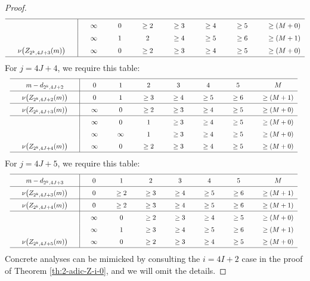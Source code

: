 \documentclass[12pt,reqno]{amsart}
\numberwithin{equation}{section}
\theoremstyle{theorem}
\theoremstyle{definition}
\begin{document}
\begin{proof}
\begin{align*}
{\begin{tabular*}{1.25\textwidth}{p{0pt}cp{0pt}|@{\extracolsep{\fill}}ccccccc}
				\hline
				&  && $\infty$ & $0$ & $\ge 2$ & $\ge 3$ & $\ge 4$ & $\ge 5$ & $\ge (M+0)$\\
				&  && $\infty$ & $1$ & $2$ & $\ge 4$ & $\ge 5$ & $\ge 6$ & $\ge (M+1)$\\
				& $\nu\big(Z_{2^k,4J+3}(m)\big)$ && $\infty$ & $0$ & $\ge 2$ & $\ge 3$ & $\ge 4$ & $\ge 5$ & $\ge (M+0)$\\
				\hline
			\end{tabular*}
		}
	\end{align*}
	For $j=4J+4$, we require this table:
	\begin{align*}
		\renewcommand\arraystretch{1.5}
		\scalebox{0.8}{%
			\begin{tabular*}{1.25\textwidth}{p{0pt}cp{0pt}|@{\extracolsep{\fill}}ccccccc}
				\hline
				& $m-d_{2^k,4J+2}$ && $0$ & $1$ & $2$ & $3$ & $4$ & $5$ & $M$\\
				\hline
				& $\nu\big(Z_{2^k,4J+2}(m)\big)$ && $0$ & $1$ & $\ge 3$ & $\ge 4$ & $\ge 5$ & $\ge 6$ & $\ge (M+1)$\\
				\hline
				& $\nu\big(Z_{2^k,4J+3}(m)\big)$ && $\infty$ & $0$ & $\ge 2$ & $\ge 3$ & $\ge 4$ & $\ge 5$ & $\ge (M+0)$\\
				\hline
				&  && $\infty$ & $0$ & $1$ & $\ge 3$ & $\ge 4$ & $\ge 5$ & $\ge (M+0)$\\
				&  && $\infty$ & $\infty$ & $1$ & $\ge 3$ & $\ge 4$ & $\ge 5$ & $\ge (M+0)$\\
				& $\nu\big(Z_{2^k,4J+4}(m)\big)$ && $\infty$ & $0$ & $\ge 2$ & $\ge 3$ & $\ge 4$ & $\ge 5$ & $\ge (M+0)$\\
				\hline
			\end{tabular*}
		}
	\end{align*}
	For $j=4J+5$, we require this table:
	\begin{align*}
		\renewcommand\arraystretch{1.5}
		\scalebox{0.8}{%
			\begin{tabular*}{1.25\textwidth}{p{0pt}cp{0pt}|@{\extracolsep{\fill}}ccccccc}
				\hline
				& $m-d_{2^k,4J+3}$ && $0$ & $1$ & $2$ & $3$ & $4$ & $5$ & $M$\\
				\hline
				& $\nu\big(Z_{2^k,4J+3}(m)\big)$ && $0$ & $\ge 2$ & $\ge 3$ & $\ge 4$ & $\ge 5$ & $\ge 6$ & $\ge (M+1)$\\
				\hline
				& $\nu\big(Z_{2^k,4J+4}(m)\big)$ && $0$ & $\ge 2$ & $\ge 3$ & $\ge 4$ & $\ge 5$ & $\ge 6$ & $\ge (M+1)$\\
				\hline
				&  && $\infty$ & $0$ & $\ge 2$ & $\ge 3$ & $\ge 4$ & $\ge 5$ & $\ge (M+0)$\\
				&  && $\infty$ & $1$ & $\ge 3$ & $\ge 4$ & $\ge 5$ & $\ge 6$ & $\ge (M+1)$\\
				& $\nu\big(Z_{2^k,4J+5}(m)\big)$ && $\infty$ & $0$ & $\ge 2$ & $\ge 3$ & $\ge 4$ & $\ge 5$ & $\ge (M+0)$\\
				\hline
			\end{tabular*}
		}
	\end{align*}
    Concrete analyses can be mimicked by consulting the $i=4I+2$ case in the proof of Theorem \ref{th:2-adic-Z-i-0}, and we will omit the details.
\end{proof}
\end{document}
